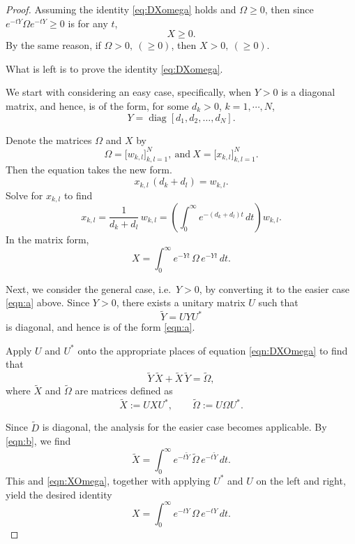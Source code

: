 \documentclass{article}
\numberwithin{equation}{section}
\begin{document}
\begin{proof}
Assuming the identity \eqref{eq:DXomega} holds and $\Omega\geq 0$, then since $e^{-tY} \Omega e^{-tY}\geq 0$ is for any $t$,
\[ X \geq 0. \]
By the same reason, if $\Omega > 0,\ (\geq 0)$, then $X > 0,\ (\geq 0)$.


What is left is to prove the identity \eqref{eq:DXomega}.

We start with considering an easy case, specifically, when $Y>0$ is a diagonal matrix, and hence, is of the form, for some $d_k>0$, $k=1,\cdots, N$,
\begin{equation}
  Y=\operatorname{diag}[d_1,d_2,\dots,d_N].
  \label{eqn:a}
\end{equation}

Denote the matrices $\Omega$ and $X$ by
\[
  \Omega=\bigl[w_{k,l}\bigr]_{k,l=1}^N,\ \text{and}\ 
  X=\bigl[x_{k,l}\bigr]_{k,l=1}^N.
\]
Then the equation takes the new form.
\[
  x_{k,l}\,(d_k+d_l)=w_{k,l}.
\]
Solve for $x_{k,l}$ to find
\[
  x_{k,l}
  =\frac{1}{d_k+d_l}\,w_{k,l}
  =\left(\int_0^\infty e^{-(d_k+d_l)t}\,dt\right) w_{k,l}.
\]
In the matrix form,
\begin{equation}\label{eqn:b}
  X=\int_0^\infty e^{-Yt}\,\Omega\,e^{-Yt}\,dt.
\end{equation}



Next, we consider the general case, i.e.\ $Y>0$, by converting it to the easier case \eqref{eqn:a} above.
Since $Y>0$, there exists a unitary matrix $U$ such that
\[
  \widetilde Y = UYU^*
\]
is diagonal, and hence is of the form \eqref{eqn:a}.

Apply $U$ and $U^*$ onto the appropriate places of equation \eqref{eqn:DXOmega} to find that
\[
  \widetilde Y\,\widetilde X+\widetilde X\,\widetilde Y=\widetilde\Omega,
\]
where $\widetilde X$ and $\widetilde\Omega$ are matrices defined as
\begin{equation}\label{eqn:XOmega}
  \widetilde X := UXU^*,
  \qquad
  \widetilde\Omega := U\Omega U^*.
\end{equation}

Since $\widetilde{D}$ is diagonal, the analysis for the easier case becomes applicable. By \eqref{eqn:b}, we find
\[
  \widetilde X = \int_0^\infty e^{-t\widetilde Y}\,\widetilde\Omega\,e^{-t\widetilde Y}\,dt.
\]
This and \eqref{eqn:XOmega}, together with applying $U^*$ and $U$ on the left and right, yield the desired identity
\[
  X = \int_0^\infty e^{-tY}\,\Omega\,e^{-tY}\,dt.
\]
\end{proof}
\end{document}
